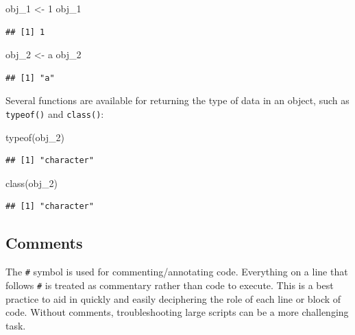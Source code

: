 \documentclass[
]{book}
\newenvironment{Shaded}{\begin{snugshade}}{\end{snugshade}}
\newcommand{\DecValTok}[1]{\textcolor[rgb]{0.00,0.00,0.81}{#1}}
\newcommand{\FunctionTok}[1]{\textcolor[rgb]{0.00,0.00,0.00}{#1}}
\newcommand{\NormalTok}[1]{#1}
\newcommand{\OtherTok}[1]{\textcolor[rgb]{0.56,0.35,0.01}{#1}}
\newcommand{\StringTok}[1]{\textcolor[rgb]{0.31,0.60,0.02}{#1}}
\begin{document}
\begin{Shaded}
\begin{Highlighting}[]
\NormalTok{obj\_1 }\OtherTok{\textless{}{-}} \DecValTok{1}
\NormalTok{obj\_1}
\end{Highlighting}
\end{Shaded}

\begin{verbatim}
## [1] 1
\end{verbatim}

\begin{Shaded}
\begin{Highlighting}[]
\NormalTok{obj\_2 }\OtherTok{\textless{}{-}} \StringTok{\textquotesingle{}a\textquotesingle{}}
\NormalTok{obj\_2}
\end{Highlighting}
\end{Shaded}

\begin{verbatim}
## [1] "a"
\end{verbatim}

Several functions are available for returning the type of data in an object, such as \texttt{typeof()} and \texttt{class()}:

\begin{Shaded}
\begin{Highlighting}[]
\FunctionTok{typeof}\NormalTok{(obj\_2)}
\end{Highlighting}
\end{Shaded}

\begin{verbatim}
## [1] "character"
\end{verbatim}

\begin{Shaded}
\begin{Highlighting}[]
\FunctionTok{class}\NormalTok{(obj\_2)}
\end{Highlighting}
\end{Shaded}

\begin{verbatim}
## [1] "character"
\end{verbatim}

\hypertarget{comments}{%
\subsection{Comments}\label{comments}}

The \texttt{\#} symbol is used for commenting/annotating code. Everything on a line that follows \texttt{\#} is treated as commentary rather than code to execute. This is a best practice to aid in quickly and easily deciphering the role of each line or block of code. Without comments, troubleshooting large scripts can be a more challenging task.
\end{document}
